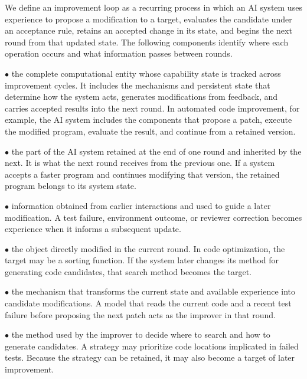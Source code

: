 \noindent{}
We define an improvement loop as a recurring process in which an AI system uses experience to propose a modification to a target, evaluates the candidate under an acceptance rule, retains an accepted change in its state, and begins the next round from that updated state. The following components identify where each operation occurs and what information passes between rounds.

\noindent$\bullet$  the complete computational entity whose capability state is tracked across improvement cycles. It includes the mechanisms and persistent state that determine how the system acts, generates modifications from feedback, and carries accepted results into the next round. In automated code improvement, for example, the AI system includes the components that propose a patch, execute the modified program, evaluate the result, and continue from a retained version.

\noindent$\bullet$  the part of the AI system retained at the end of one round and inherited by the next. It is what the next round receives from the previous one. If a system accepts a faster program and continues modifying that version, the retained program belongs to its system state.

\noindent$\bullet$  information obtained from earlier interactions and used to guide a later modification. A test failure, environment outcome, or reviewer correction becomes experience when it informs a subsequent update.

\noindent$\bullet$  the object directly modified in the current round. In code optimization, the target may be a sorting function. If the system later changes its method for generating code candidates, that search method becomes the target.

\noindent$\bullet$  %
the mechanism that transforms the current state and available experience into candidate modifications. A model that reads the current code and a recent test failure before proposing the next patch acts as the improver in that round.

\noindent$\bullet$  the method used by the improver to decide where to search and how to generate candidates. A strategy may prioritize code locations implicated in failed tests. Because the strategy can be retained, it may also become a target of later improvement.

